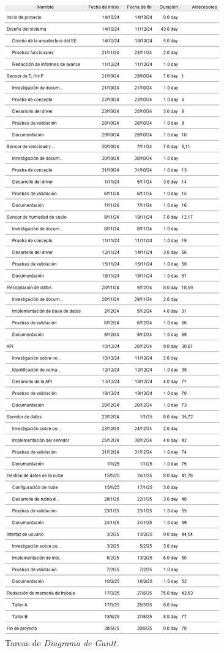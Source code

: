 \documentclass[
11pt, %
codirector, %
]{charter}
\begin{document}
\begin{figure}[htpb]
\centering 
\includegraphics[width=.7\textwidth, height=.74\textheight]{./Figuras/GdP_T.png}
\caption{Tareas de \textit{Diagrama de Gantt}.}
\label{fig:ganttTasks}
\end{figure}
\end{document}
